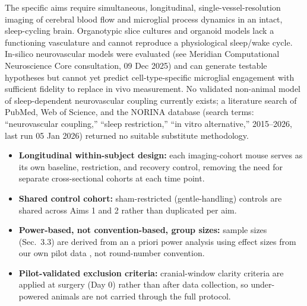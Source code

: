 

\begin{tcolorbox}[narrbox={3.1 Replacement --- Why non-animal or lower-order alternatives cannot answer this question}]
The specific aims require simultaneous, longitudinal, single-vessel-resolution imaging of
cerebral blood flow and microglial process dynamics in an intact, sleep-cycling brain.
Organotypic slice cultures and organoid models lack a functioning vasculature and cannot
reproduce a physiological sleep/wake cycle. In-silico neurovascular models were evaluated
(see Meridian Computational Neuroscience Core consultation, 09 Dec 2025) and can generate
testable hypotheses but cannot yet predict cell-type-specific microglial engagement with
sufficient fidelity to replace in vivo measurement. No validated non-animal model of
sleep-dependent neurovascular coupling currently exists; a literature search of PubMed,
Web of Science, and the NORINA database (search terms: ``neurovascular coupling,'' ``sleep
restriction,'' ``in vitro alternative,'' 2015--2026, last run 05 Jan 2026) returned no
suitable substitute methodology.
\end{tcolorbox}

\vspace{6pt}

\begin{tcolorbox}[narrbox={3.2 Reduction --- Minimizing animal numbers without compromising validity}]
\begin{itemize}
  \item \textbf{Longitudinal within-subject design:} each imaging-cohort mouse serves as its
    own baseline, restriction, and recovery control, removing the need for separate
    cross-sectional cohorts at each time point.
  \item \textbf{Shared control cohort:} sham-restricted (gentle-handling) controls are shared
    across Aims 1 and 2 rather than duplicated per aim.
  \item \textbf{Power-based, not convention-based, group sizes:} sample sizes (Sec.\ 3.3) are
    derived from an a priori power analysis using effect sizes from our own pilot data
    \cite{lindqvist2024cortical}, not round-number convention.
  \item \textbf{Pilot-validated exclusion criteria:} cranial-window clarity criteria are
    applied at surgery (Day 0) rather than after data collection, so under-powered animals are
    not carried through the full protocol.
\end{itemize}
\end{tcolorbox}

